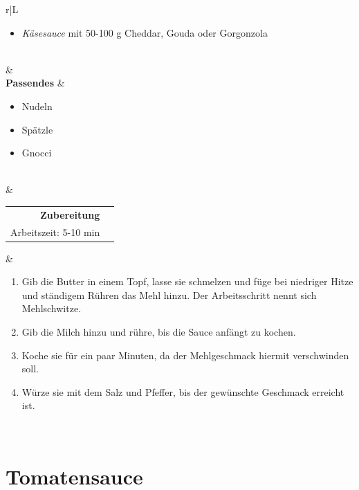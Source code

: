 \documentclass[a4paper, 12pt]{scrbook} 								%
\numberwithin{equation}{section} 									%
\begin{document}
\begin{tabularx}{\textwidth}{r|L}
\begin{itemize}[]
										\item \textit{Käsesauce} mit 50-100 g Cheddar, Gouda oder Gorgonzola 
									\end{itemize}	\\
								&	\\	
		\textbf{Passendes}		&	\begin{itemize}[]
										\item Nudeln
										\item Spätzle
										\item Gnocci
									\end{itemize}	\\
								&	\\	
		\begin{tabular}[t]{rr}
			\textbf{Zubereitung}	\\
			Arbeitszeit: 5-10 min		\\
		\end{tabular}			&	\begin{enumerate}[]
										\item Gib die Butter in einem Topf, lasse sie schmelzen und füge bei niedriger Hitze und ständigem Rühren das Mehl hinzu. Der Arbeitsschritt nennt sich Mehlschwitze.
										\item Gib die Milch hinzu und rühre, bis die Sauce anfängt zu kochen.
										\item Koche sie für ein paar Minuten, da der Mehlgeschmack hiermit verschwinden soll.
										\item Würze sie mit dem Salz und Pfeffer, bis der gewünschte Geschmack erreicht ist. 
									\end{enumerate}	\\
	\end{tabularx}
	\newpage


	\section{Tomatensauce}	\label{tomatensauce}
\end{document}
